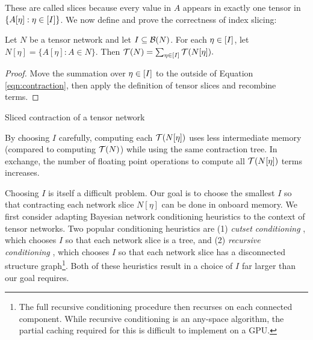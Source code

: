 These are called slices because every value in $A$ appears in exactly one tensor in $\{ A[\eta] : \eta \in [I] \}$. We now define and prove the correctness of index slicing: 
\begin{theorem}
Let $N$ be a tensor network and let $I \subseteq \mathcal{B}(N)$. For each $\eta \in [I]$, let $N[\eta] = \{ A[\eta] : A \in N\}$. Then $\mathcal{T}(N) = \sum_{\eta \in [I]} \mathcal{T}(N[\eta]).$
\end{theorem}
\begin{proof}
Move the summation over $\eta \in [I]$ to the outside of Equation \ref{eqn:contraction}, then apply the definition of tensor slices and recombine terms.
\end{proof}

\begin{algorithm*}[t]
    \caption{Sliced contraction of a tensor network}
    \label{alg:tn-sliced}
    \DontPrintSemicolon
\end{algorithm*}

By choosing $I$ carefully, computing each $\mathcal{T}(N[\eta])$ uses less intermediate memory (compared to computing $\mathcal{T}(N)$) while using the same contraction tree. In exchange, the number of floating point operations to compute all $\mathcal{T}(N[\eta])$ terms increases. 

Choosing $I$ is itself a difficult problem. Our goal is to choose the smallest $I$ so that contracting each network slice $N[\eta]$ can be done in onboard memory. We first consider adapting Bayesian network conditioning heuristics to the context of tensor networks. Two popular conditioning heuristics are (1) \emph{cutset conditioning} \cite{pearl86}, which chooses $I$ so that each network slice is a tree, and (2) \emph{recursive conditioning} \cite{darwiche01}, which chooses $I$ so that each network slice has a disconnected structure graph\footnote{The full recursive conditioning procedure then recurses on each connected component. While recursive conditioning is an any-space algorithm, the partial caching required for this is difficult to implement on a GPU.}. Both of these heuristics result in a choice of $I$ far larger than our goal requires. 


